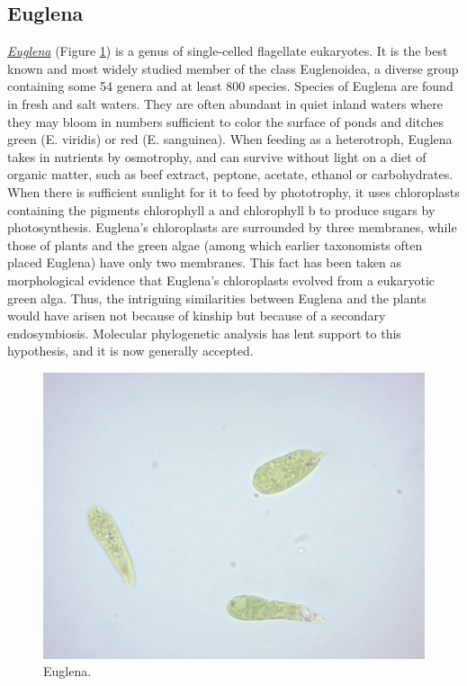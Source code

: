 \subsection{Euglena}\label{euglena}

\href{https://en.wikipedia.org/wiki/Euglena}{\emph{Euglena}} (Figure
\ref{fig:euglena}) is a genus of single-celled flagellate eukaryotes. It
is the best known and most widely studied member of the class
Euglenoidea, a diverse group containing some 54 genera and at least 800
species. Species of Euglena are found in fresh and salt waters. They are
often abundant in quiet inland waters where they may bloom in numbers
sufficient to color the surface of ponds and ditches green (E. viridis)
or red (E. sanguinea). When feeding as a heterotroph, Euglena takes in
nutrients by osmotrophy, and can survive without light on a diet of
organic matter, such as beef extract, peptone, acetate, ethanol or
carbohydrates. When there is sufficient sunlight for it to feed by
phototrophy, it uses chloroplasts containing the pigments chlorophyll a
and chlorophyll b to produce sugars by photosynthesis. Euglena's
chloroplasts are surrounded by three membranes, while those of plants
and the green algae (among which earlier taxonomists often placed
Euglena) have only two membranes. This fact has been taken as
morphological evidence that Euglena's chloroplasts evolved from a
eukaryotic green alga. Thus, the intriguing similarities between Euglena
and the plants would have arisen not because of kinship but because of a
secondary endosymbiosis. Molecular phylogenetic analysis has lent
support to this hypothesis, and it is now generally accepted.

\begin{figure}

{\centering \includegraphics[width=0.7\linewidth]{./figures/protists/euglena}

}

\caption{Euglena.}\label{fig:euglena}
\end{figure}

